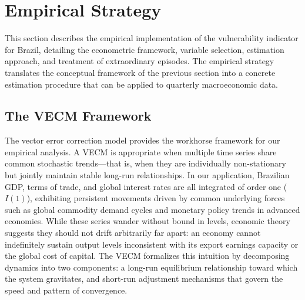 \documentclass[12pt,a4paper]{article}
\numberwithin{equation}{section}
\theoremstyle{definition}
\theoremstyle{remark}
\begin{document}

\section{Empirical Strategy}
\label{sec:strategy}

This section describes the empirical implementation of the vulnerability indicator for Brazil, detailing the econometric framework, variable selection, estimation approach, and treatment of extraordinary episodes. The empirical strategy translates the conceptual framework of the previous section into a concrete estimation procedure that can be applied to quarterly macroeconomic data.


\subsection{The VECM Framework}

The vector error correction model provides the workhorse framework for our empirical analysis. A VECM is appropriate when multiple time series share common stochastic trends---that is, when they are individually non-stationary but jointly maintain stable long-run relationships. In our application, Brazilian GDP, terms of trade, and global interest rates are all integrated of order one ($I(1)$), exhibiting persistent movements driven by common underlying forces such as global commodity demand cycles and monetary policy trends in advanced economies. While these series wander without bound in levels, economic theory suggests they should not drift arbitrarily far apart: an economy cannot indefinitely sustain output levels inconsistent with its export earnings capacity or the global cost of capital. The VECM formalizes this intuition by decomposing dynamics into two components: a long-run equilibrium relationship toward which the system gravitates, and short-run adjustment mechanisms that govern the speed and pattern of convergence.
\end{document}
